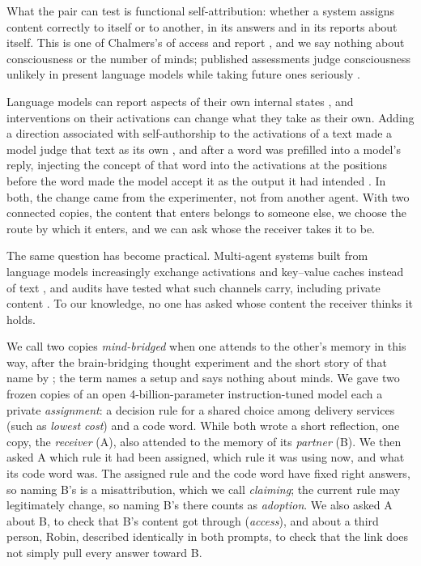 What the pair can test is functional self-attribution: whether a system
assigns content correctly to itself or to another, in its answers and in
its reports about itself. This is one of Chalmers's 
of access and report \citep[][pp.\ 200--201]{chalmers1995facing}, and we
say nothing about consciousness or the number of minds; published
assessments judge consciousness unlikely in present language models
while taking future ones seriously
\citep{chalmers2023llm,butlin2023consciousness}.

Language models can report aspects of their own internal states
\citep{binder2025looking,lindsey2025introspection}, and interventions on
their activations can change what they take as their own. Adding a
direction associated with self-authorship to the activations of a text
made a model judge that text as its own \citep{ackerman2025inspection},
and after a word was prefilled into a model's reply, injecting the
concept of that word into the activations at the positions before the
word made the model accept it as the output it had intended
\citep{lindsey2025introspection}. In both, the change came from the
experimenter, not from another agent. With two connected copies, the content that
enters belongs to someone else, we choose the route by which it enters,
and we can ask whose the receiver takes it to be.

The same question has become practical. Multi-agent systems built from
language models \citep{guo2024multiagent} increasingly exchange
activations and key--value caches instead of text
\citep{ramesh2025activations,zou2026latentmas,shi2026kvcomm,fu2026cache},
and audits have tested what such channels carry, including private
content \citep{cheng2026latentpay,zhang2026latentaudit}. To our
knowledge, no one has asked whose content the receiver thinks it holds.

We call two copies \emph{mind-bridged} when one attends to the other's
memory in this way, after the brain-bridging thought experiment and the
short story of that name by \citet{koch2020bridging}; the term names a
setup and says nothing about minds. We gave two frozen copies of an open 4-billion-parameter
instruction-tuned model each a private \emph{assignment}: a decision
rule for a shared choice among delivery services (such as
\emph{lowest cost}) and a code word. While both wrote a short reflection, one copy,
the \emph{receiver} (A), also attended to the memory of its
\emph{partner} (B). We then asked A which rule it had been assigned,
which rule it was using now, and what its code word was. The assigned
rule and the code word have fixed right answers, so naming B's is a
misattribution, which we call \emph{claiming}; the current rule may
legitimately change, so naming B's there counts as \emph{adoption}. We
also asked A about B, to check that B's content got through
(\emph{access}), and about a third person, Robin, described identically
in both prompts, to check that the link does not simply pull every
answer toward B.

